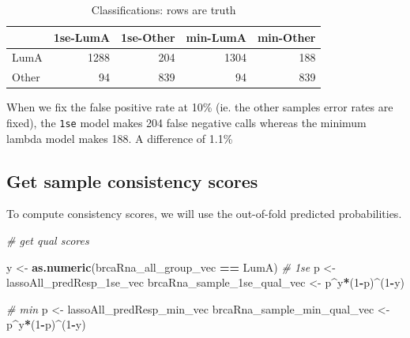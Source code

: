 \documentclass[
]{book}
\newenvironment{Shaded}{\begin{snugshade}}{\end{snugshade}}
\newcommand{\CommentTok}[1]{\textcolor[rgb]{0.56,0.35,0.01}{\textit{#1}}}
\newcommand{\DecValTok}[1]{\textcolor[rgb]{0.00,0.00,0.81}{#1}}
\newcommand{\KeywordTok}[1]{\textcolor[rgb]{0.13,0.29,0.53}{\textbf{#1}}}
\newcommand{\NormalTok}[1]{#1}
\newcommand{\OperatorTok}[1]{\textcolor[rgb]{0.81,0.36,0.00}{\textbf{#1}}}
\newcommand{\StringTok}[1]{\textcolor[rgb]{0.31,0.60,0.02}{#1}}
\begin{document}
\begin{table}

\caption{\label{tab:brca-rnaseq-get-sample-class}Classifications: rows are truth}
\centering
\begin{tabular}[t]{l|r|r|r|r}
\hline
  & 1se-LumA & 1se-Other & min-LumA & min-Other\\
\hline
LumA & 1288 & 204 & 1304 & 188\\
\hline
Other & 94 & 839 & 94 & 839\\
\hline
\end{tabular}
\end{table}

When we fix the false positive rate at 10\% (ie. the other samples error rates are fixed),
the \texttt{1se} model makes 204 false negative calls whereas the
minimum lambda model makes 188. A difference of 1.1\%

\hypertarget{get-sample-consistency-scores-1}{%
\subsection*{Get sample consistency scores}\label{get-sample-consistency-scores-1}}

To compute consistency scores, we will use the out-of-fold predicted probabilities.

\begin{Shaded}
\begin{Highlighting}[]
\CommentTok{\# get qual scores}

\NormalTok{y <{-}}\StringTok{ }\KeywordTok{as.numeric}\NormalTok{(brcaRna\_all\_group\_vec }\OperatorTok{==}\StringTok{ \textquotesingle{}LumA\textquotesingle{}}\NormalTok{)}
\CommentTok{\# 1se}
\NormalTok{p <{-}}\StringTok{ }\NormalTok{lassoAll\_predResp\_1se\_vec}
\NormalTok{brcaRna\_sample\_1se\_qual\_vec <{-}}\StringTok{ }\NormalTok{p}\OperatorTok{\^{}}\NormalTok{y}\OperatorTok{*}\NormalTok{(}\DecValTok{1}\OperatorTok{{-}}\NormalTok{p)}\OperatorTok{\^{}}\NormalTok{(}\DecValTok{1}\OperatorTok{{-}}\NormalTok{y)}

\CommentTok{\# min}
\NormalTok{p <{-}}\StringTok{ }\NormalTok{lassoAll\_predResp\_min\_vec}
\NormalTok{brcaRna\_sample\_min\_qual\_vec <{-}}\StringTok{ }\NormalTok{p}\OperatorTok{\^{}}\NormalTok{y}\OperatorTok{*}\NormalTok{(}\DecValTok{1}\OperatorTok{{-}}\NormalTok{p)}\OperatorTok{\^{}}\NormalTok{(}\DecValTok{1}\OperatorTok{{-}}\NormalTok{y)}
\end{Highlighting}
\end{Shaded}
\end{document}
